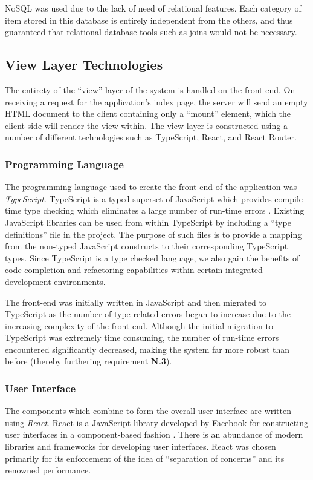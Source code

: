 \documentclass{l4proj}
\begin{document}
         NoSQL was used due to the lack of need of relational features. Each category of item stored in this database is entirely independent from the others, and thus guaranteed that relational database tools such as joins would not be necessary.

    \subsection{View Layer Technologies}
    
    The entirety of the ``view'' layer of the system is handled on the front-end. On receiving a request for the application's index page, the server will send an empty HTML document to the client containing only a ``mount'' element, which the client side will render the view within. The view layer is constructed using a number of different technologies such as TypeScript, React, and React Router.
    
    \subsubsection{Programming Language}
        The programming language used to create the front-end of the application was \textit{TypeScript}. TypeScript is a typed superset of JavaScript which provides compile-time type checking which eliminates a large number of run-time errors \cite{typescript}. Existing JavaScript libraries can be used from within TypeScript by including a ``type definitions'' file in the project. The purpose of such files is to provide a mapping from the non-typed JavaScript constructs to their corresponding TypeScript types. Since TypeScript is a type checked language, we also gain the benefits of code-completion and refactoring capabilities within certain integrated development environments.
        
        The front-end was initially written in JavaScript and then migrated to TypeScript as the number of type related errors began to increase due to the increasing complexity of the front-end. Although the initial migration to TypeScript was extremely time consuming, the number of run-time errors encountered significantly decreased, making the system far more robust than before (thereby furthering requirement \textbf{N.3}).
    
        \subsubsection{User Interface}
        The components which combine to form the overall user interface are written using \textit{React}. React is a JavaScript library developed by Facebook for constructing user interfaces in a component-based fashion \cite{react}. There is an abundance of modern libraries and frameworks for developing user interfaces. React was chosen primarily for its enforcement of the idea of ``separation of concerns'' and its renowned performance.
        
\end{document}
